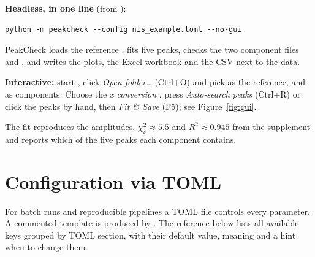 \documentclass[11pt,a4paper]{article}
\begin{document}
\noindent\textbf{Headless, in one line} (from ):
\begin{lstlisting}[style=py]
python -m peakcheck --config nis_example.toml --no-gui
\end{lstlisting}
PeakCheck loads the reference , fits five peaks, checks the two
component files  and , and writes the plots,
the Excel workbook and the CSV next to the data.

\noindent\textbf{Interactive:} start , click \emph{Open folder\dots}
(Ctrl+O) and pick  as the reference,  and
 as components. Choose the \emph{x conversion}
, press \emph{Auto-search peaks} (Ctrl+R) or click the peaks by
hand, then \emph{Fit \& Save} (F5); see Figure~\ref{fig:gui}.

\noindent The fit reproduces the amplitudes, $\chi^2_\nu\approx5.5$ and
$R^2\approx0.945$ from the supplement and reports which of the five peaks each
component contains.

\section{Configuration via TOML}
For batch runs and reproducible pipelines a TOML file controls every parameter. A
commented template is produced by
. The reference below lists
all available keys grouped by TOML section, with their default value, meaning and
a hint when to change them.
\end{document}
